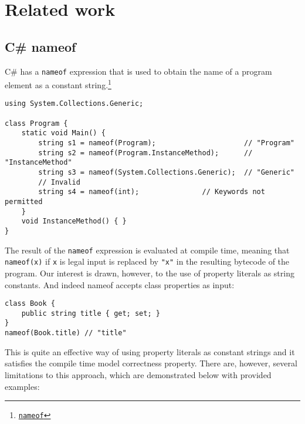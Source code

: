 

\chapter{Related work}

\section{C\# nameof}

    C\# has a \texttt{nameof} expression that is used to obtain the name of a program element as a constant string.\footnote{\href{https://docs.microsoft.com/en-us/dotnet/csharp/language-reference/operators/nameof}{\texttt{nameof}}} 

\begin{verbatim}
using System.Collections.Generic;

class Program {
    static void Main() {
        string s1 = nameof(Program);                     // "Program"
        string s2 = nameof(Program.InstanceMethod);      // "InstanceMethod"
        string s3 = nameof(System.Collections.Generic);  // "Generic"
        // Invalid
        string s4 = nameof(int);               // Keywords not permitted
    }
    void InstanceMethod() { }
}
\end{verbatim}

The result of the \texttt{nameof} expression is evaluated at compile time, meaning that \texttt{nameof(x)} if \texttt{x} is legal input is replaced by \texttt{"x"} in the resulting bytecode of the program. Our interest is drawn, however, to the use of property literals as string constants. And indeed nameof accepts class properties as input:

\begin{verbatim}
class Book {
    public string title { get; set; }
}
nameof(Book.title) // "title"
\end{verbatim}

This is quite an effective way of using property literals as constant strings and it satisfies the compile time model correctness property. There are, however, several limitations to this approach, which are demonstrated below with provided examples:

